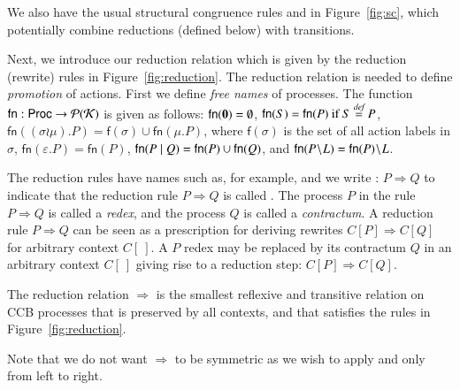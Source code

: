{We also have the usual structural congruence rules 
 and  in Figure~\ref{fig:sc}, 
which potentially combine reductions (defined below) with transitions.

Next, we introduce our reduction relation which is given by the reduction (rewrite) rules 
in Figure~\ref{fig:reduction}. The reduction relation is needed to define {\em promotion} 
of actions. First we define {\em free names} of processes. 
%
The function 
$\mathsf{fn}: \mathsf{Proc} \rightarrow \mathcal{P}(\mathcal{K})$ is given as follows: 
$\mathsf{fn}(\mathbf{0}) = \emptyset$,
$\mathsf{fn}(S)=\mathsf{fn}(P) \text{ if }  S\stackrel{\emph{def}}{=} P$, 
$\mathsf{fn}((\sigma\wr \mu).P)=\mathsf{f}(\sigma)\cup \mathsf{fn}(\mu.P)$, where $\mathsf{f}(\sigma)$ is the set of all action labels in $\sigma$,
$\mathsf{fn}(\varepsilon.P)=\mathsf{fn}(P) $, $\mathsf{fn}(P\; \vert \; Q)=\mathsf{fn}(P) \cup \mathsf{fn}(Q)$, and $\mathsf{fn}(P \!\setminus\!L)=\mathsf{fn}(P) \!\setminus\!L$.


The reduction rules have names such as, for example,  and we write 
: $P \Rightarrow Q$
to indicate that the reduction rule $P \Rightarrow Q$ is called . 
The process $P$ in the rule
$P\Rightarrow Q$ is called a \emph{redex}, and the process $Q$ is called a \emph{contractum}. 
A reduction rule $P\Rightarrow Q$ can be seen as a prescription 
for deriving rewrites $C[P] \Rightarrow C[Q]$ for arbitrary context $C[\ ]$. 
A $P$ redex may be replaced by its contractum $Q$ in an arbitrary context 
$C[\ ]$ giving rise to a reduction step: $C[P] \Rightarrow C[Q]$.

\begin{definition} \normalfont The reduction relation $\Rightarrow$ is the smallest reflexive and 
transitive relation on CCB processes that is preserved by all contexts, and that satisfies the rules 
in Figure~\ref{fig:reduction}.
\end{definition}
Note that we do not want $\Rightarrow$ to be symmetric as we wish to apply  and  only 
from left to right. 

}
